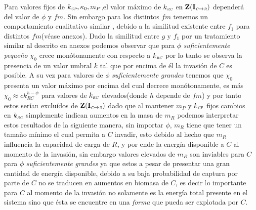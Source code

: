 Para valores fijos de $k_{\textit{\tiny CP}}, \kappa_0 ,m_P$,el valor m\'aximo de $k_{\textit{\tiny RC}}$ en $\mathbf{Z(I_{\textit{\tiny C}\to \textit{\tiny R}})}$ depender\'a del valor de $\phi$ y $fm$. Sin embargo para los distintos $fm$ tenemos un comportamiento cualitativo similar , debido a la similitud existente entre $f_1$ para distintos $fm$(v\'ease anexos). Dado la similitud entre $g$ y $f_1$ por un tratamiento similar al descrito en anexos podemos observar que para $\phi$ \emph{suficientemente peque\~no} $\chi_0$ crece mon\'otonamente con respecto a $k_{\textit{\tiny RC}}$ por lo tanto se observa la presencia de un valor umbral $k$ tal que por encima de \'el la invasi\'on de $C$ es posible. A su vez para valores de $\phi$ \emph{suficientemente grandes} tenemos que $\chi_0$ presenta un valor m\'aximo por encima del cual decrece mon\'otonamente, es m\'as $\chi_0 \approx c k_{RC}^{h - \phi}$ para valores de $k_{\textit{\tiny RC}}$ elevados(donde $h$ depende de $fm$) y por tanto estos ser\'ian exclu\'idos de $\mathbf{Z(I_{\textit{\tiny C}\to \textit{\tiny R}})}$ dado que al mantener $m_P$ y $k_{\textit{\tiny CP}}$ fijos cambios en $k_{\textit{\tiny RC}}$ simplemente indican aumentos en la masa de $m_R$ podemos interpretar estos resultados de la siguiente manera, sin importar $\phi$, $m_R$ tiene que tener un tama\~no m\'inimo el cual permita a $C$ invadir, esto debido al hecho que $m_R$ influencia la capacidad de carga de $R$, y por ende la energ\'ia disponible a $C$ al momento de la invasi\'on, sin embargo valores elevados de $m_R$ son inviables para $C$ para $\phi$ \emph{suficientemente grandes} ya que estos a pesar de presentar una gran cantidad de energ\'ia disponible, debido a su baja probabilidad de captura por parte de $C$ no se traducen en aumentos en biomasa de $C$, es decir lo importante para $C$ al momento de la invasi\'on no solamente es la energ\'ia total presente en el sistema sino que \'esta se encuentre en una \emph{forma} que pueda ser explotada por $C$.


